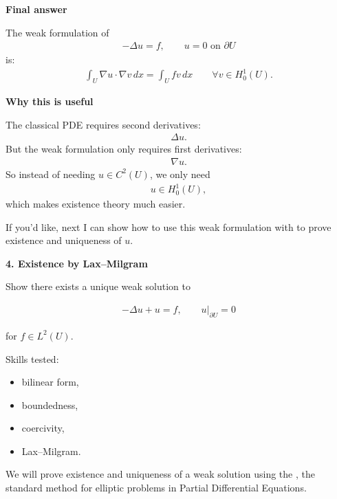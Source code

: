 \documentclass[12pt,a4paper]{report}
\begin{document}
\begin{description}
\begin{description}
\item \textbf{Final answer}

The weak formulation of
\begin{align*}
-\Delta u=f,\qquad u=0\text{ on }\partial U
\end{align*}
is:
\begin{align*}
\boxed{
\int_U \nabla u\cdot\nabla v\,dx = \int_U fv\,dx \qquad\forall v\in H_0^1(U).
}
\end{align*}

\item \textbf{Why this is useful}

The classical PDE requires second derivatives:
\begin{align*}
\Delta u.
\end{align*}
But the weak formulation only requires first derivatives:
\begin{align*}
\nabla u.
\end{align*}
So instead of needing $u\in C^2(U)$, we only need
\begin{align*}
u\in H_0^1(U),
\end{align*}
which makes existence theory much easier.

\end{description}

If you'd like, next I can show how to use this weak formulation with  to prove existence and uniqueness of $u$.


\newpage\item \textbf{4. Existence by Lax–Milgram}

Show there exists a unique weak solution to

\begin{align*}
-\Delta u+u=f,\qquad u|_{\partial U}=0
\end{align*}

for $f\in L^2(U)$.

Skills tested:

	\begin{itemize}
    \item bilinear form,
    \item boundedness,
    \item coercivity,
    \item Lax–Milgram.
	\end{itemize}

\HLINE


We will prove existence and uniqueness of a weak solution using the , the standard method for elliptic problems in Partial Differential Equations.


\end{description}
\end{document}
